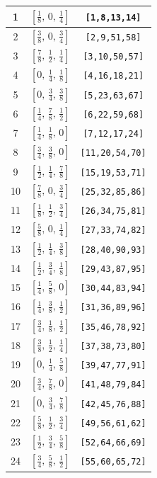 \documentclass[fleqn,8pt]{jsarticle}
\begin{document}
\begin{longtable}{ccc}
1 & $\left[ \frac{1}{8},\, 0,\, \frac{1}{4} \right]$ & {\tt [1,8,13,14]} \\ \hline
2 & $\left[ \frac{3}{8},\, 0,\, \frac{3}{4} \right]$ & {\tt [2,9,51,58]} \\ \hline
3 & $\left[ \frac{7}{8},\, \frac{1}{2},\, \frac{1}{4} \right]$ & {\tt [3,10,50,57]} \\ \hline
4 & $\left[ 0,\, \frac{1}{4},\, \frac{1}{8} \right]$ & {\tt [4,16,18,21]} \\ \hline
5 & $\left[ 0,\, \frac{3}{4},\, \frac{3}{8} \right]$ & {\tt [5,23,63,67]} \\ \hline
6 & $\left[ \frac{1}{4},\, \frac{7}{8},\, \frac{1}{2} \right]$ & {\tt [6,22,59,68]} \\ \hline
7 & $\left[ \frac{1}{4},\, \frac{1}{8},\, 0 \right]$ & {\tt [7,12,17,24]} \\ \hline
8 & $\left[ \frac{3}{4},\, \frac{3}{8},\, 0 \right]$ & {\tt [11,20,54,70]} \\ \hline
9 & $\left[ \frac{1}{2},\, \frac{1}{4},\, \frac{7}{8} \right]$ & {\tt [15,19,53,71]} \\ \hline
10 & $\left[ \frac{7}{8},\, 0,\, \frac{3}{4} \right]$ & {\tt [25,32,85,86]} \\ \hline
11 & $\left[ \frac{1}{8},\, \frac{1}{2},\, \frac{3}{4} \right]$ & {\tt [26,34,75,81]} \\ \hline
12 & $\left[ \frac{5}{8},\, 0,\, \frac{1}{4} \right]$ & {\tt [27,33,74,82]} \\ \hline
13 & $\left[ \frac{1}{2},\, \frac{1}{4},\, \frac{3}{8} \right]$ & {\tt [28,40,90,93]} \\ \hline
14 & $\left[ \frac{1}{2},\, \frac{3}{4},\, \frac{1}{8} \right]$ & {\tt [29,43,87,95]} \\ \hline
15 & $\left[ \frac{1}{4},\, \frac{5}{8},\, 0 \right]$ & {\tt [30,44,83,94]} \\ \hline
16 & $\left[ \frac{1}{4},\, \frac{3}{8},\, \frac{1}{2} \right]$ & {\tt [31,36,89,96]} \\ \hline
17 & $\left[ \frac{3}{4},\, \frac{1}{8},\, \frac{1}{2} \right]$ & {\tt [35,46,78,92]} \\ \hline
18 & $\left[ \frac{3}{8},\, \frac{1}{2},\, \frac{1}{4} \right]$ & {\tt [37,38,73,80]} \\ \hline
19 & $\left[ 0,\, \frac{1}{4},\, \frac{5}{8} \right]$ & {\tt [39,47,77,91]} \\ \hline
20 & $\left[ \frac{3}{4},\, \frac{7}{8},\, 0 \right]$ & {\tt [41,48,79,84]} \\ \hline
21 & $\left[ 0,\, \frac{3}{4},\, \frac{7}{8} \right]$ & {\tt [42,45,76,88]} \\ \hline
22 & $\left[ \frac{5}{8},\, \frac{1}{2},\, \frac{3}{4} \right]$ & {\tt [49,56,61,62]} \\ \hline
23 & $\left[ \frac{1}{2},\, \frac{3}{4},\, \frac{5}{8} \right]$ & {\tt [52,64,66,69]} \\ \hline
24 & $\left[ \frac{3}{4},\, \frac{5}{8},\, \frac{1}{2} \right]$ & {\tt [55,60,65,72]} \\
\end{longtable}
\end{document}
